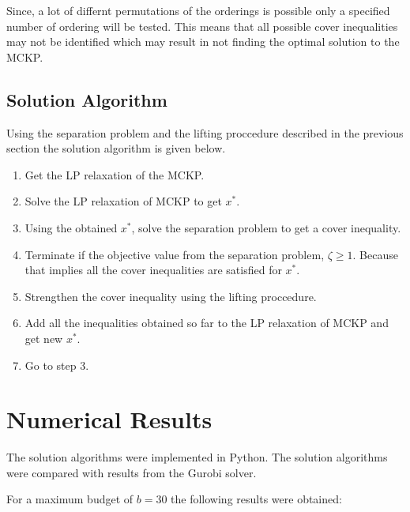 \documentclass[10pt]{article}
\begin{document}
    Since, a lot of differnt permutations of the orderings is possible only a specified number of ordering will be tested. This means that all possible
    cover inequalities may not be identified which may result in not finding the optimal solution to the MCKP.
    
    \subsection{Solution Algorithm}
    Using the separation problem and the lifting proccedure described in the previous section the solution algorithm is given below.
    \begin{enumerate}
        \item Get the LP relaxation of the MCKP.
        \item Solve the LP relaxation of MCKP to get $x^*$.
        \item Using the obtained $x^*$, solve the separation problem to get a cover inequality.
        \item Terminate if the objective value from the separation problem, $\zeta \geq 1$. 
        Because that implies all the cover inequalities are satisfied for $x^*$.
        \item Strengthen the cover inequality using the lifting proccedure.
        \item Add all the inequalities obtained so far to the LP relaxation of MCKP and get new $x^*$.
        \item Go to step 3.
    \end{enumerate}

    \section{Numerical Results}
    The solution algorithms were implemented in Python. The solution algorithms were compared with results from the Gurobi solver.

    For a maximum budget of $b = 30$ the following results were obtained:
    
\end{document}
